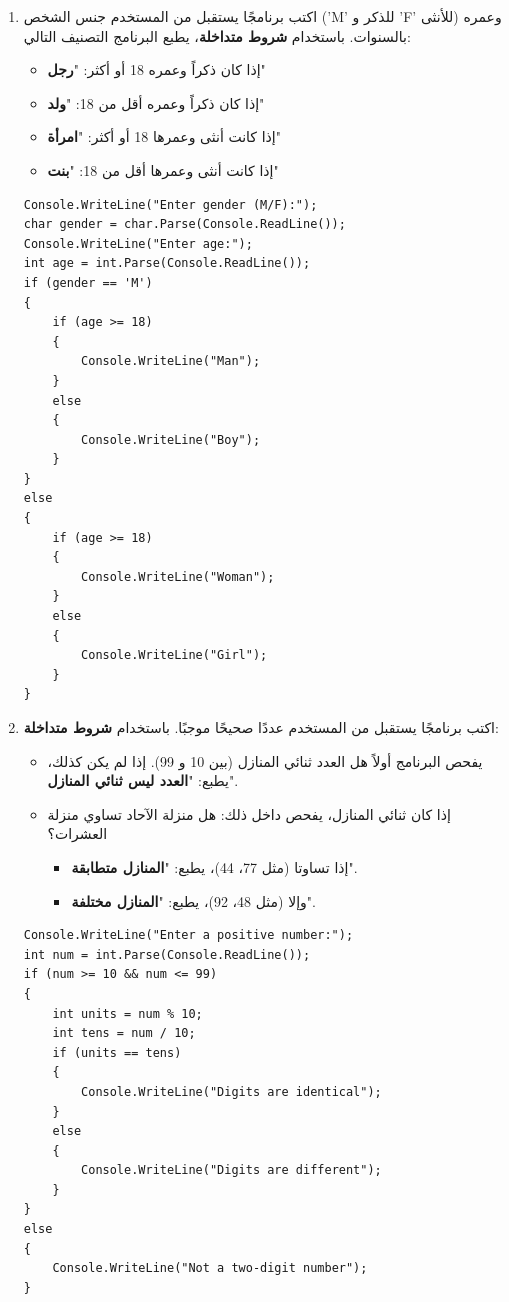 \documentclass[14pt]{extarticle}
\begin{document}
\begin{enumerate}[resume, itemsep=2em]
\filbreak
\item
اكتب برنامجًا يستقبل من المستخدم جنس الشخص (\textenglish{'M'} للذكر و \textenglish{'F'} للأنثى) وعمره بالسنوات. باستخدام \textbf{شروط متداخلة}، يطبع البرنامج التصنيف التالي:
\begin{itemize}
\item إذا كان ذكراً وعمره 18 أو أكثر: "\textbf{رجل}"
\item إذا كان ذكراً وعمره أقل من 18: "\textbf{ولد}"
\item إذا كانت أنثى وعمرها 18 أو أكثر: "\textbf{امرأة}"
\item إذا كانت أنثى وعمرها أقل من 18: "\textbf{بنت}"
\end{itemize}
\ifwithsols
\begin{boxSolution}
\begin{english}
\begin{verbatim}
Console.WriteLine("Enter gender (M/F):");
char gender = char.Parse(Console.ReadLine());
Console.WriteLine("Enter age:");
int age = int.Parse(Console.ReadLine());
if (gender == 'M')
{
    if (age >= 18)
    {
        Console.WriteLine("Man");
    }
    else
    {
        Console.WriteLine("Boy");
    }
}
else
{
    if (age >= 18)
    {
        Console.WriteLine("Woman");
    }
    else
    {
        Console.WriteLine("Girl");
    }
}
\end{verbatim}
\end{english}
\end{boxSolution}
\fi

\filbreak
\item
اكتب برنامجًا يستقبل من المستخدم عددًا صحيحًا موجبًا. باستخدام \textbf{شروط متداخلة}:
\begin{itemize}
\item يفحص البرنامج أولاً هل العدد ثنائي المنازل (بين 10 و 99). إذا لم يكن كذلك، يطبع: "\textbf{العدد ليس ثنائي المنازل}".
\item إذا كان ثنائي المنازل، يفحص داخل ذلك: هل منزلة الآحاد تساوي منزلة العشرات؟
  \begin{itemize}
  \item إذا تساوتا (مثل 77، 44)، يطبع: "\textbf{المنازل متطابقة}".
  \item وإلا (مثل 48، 92)، يطبع: "\textbf{المنازل مختلفة}".
  \end{itemize}
\end{itemize}
\ifwithsols
\begin{boxSolution}
\begin{english}
\begin{verbatim}
Console.WriteLine("Enter a positive number:");
int num = int.Parse(Console.ReadLine());
if (num >= 10 && num <= 99)
{
    int units = num % 10;
    int tens = num / 10;
    if (units == tens)
    {
        Console.WriteLine("Digits are identical");
    }
    else
    {
        Console.WriteLine("Digits are different");
    }
}
else
{
    Console.WriteLine("Not a two-digit number");
}
\end{verbatim}
\end{english}
\end{boxSolution}
\fi


\end{enumerate}
\end{document}
